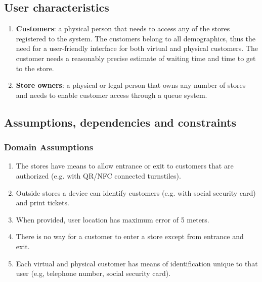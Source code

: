 \subsection{User characteristics}
\begin{enumerate}
	\item {\bfseries Customers}: a physical person that needs to access any of the stores registered to the system. The customers belong to all demographics, thus the need for a user-friendly interface for both virtual and physical customers. The customer needs a reasonably precise estimate of waiting time and time to get to the store.
	\item {\bfseries Store owners}: a physical or legal person that owns any number of stores and needs to enable customer access through a queue system.
\end{enumerate}

\subsection{Assumptions, dependencies and constraints}
\subsubsection{Domain Assumptions}
\begin{enumerate}[label=D\arabic*]
	\item The stores have means to allow entrance or exit to customers that are authorized (e.g. with QR/NFC connected turnstiles).
	\item Outside stores a device can identify customers (e.g. with social security card) and print tickets.
	\item When provided, user location has maximum error of 5 meters.
	\item There is no way for a customer to enter a store except from entrance and exit.
	\item Each virtual and physical customer has means of identification unique to that user (e.g, telephone number, social security card).
\end{enumerate}